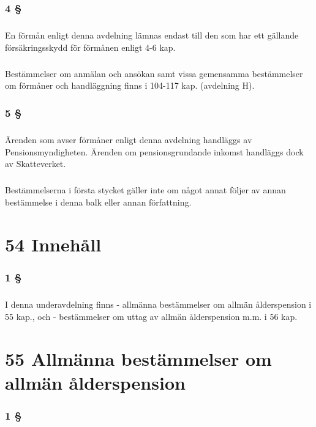 \documentclass[a4paper,notitlepage,openany,10pt]{book}
\begin{document}
\subsection*{4 §}
\paragraph*{}
En förmån enligt denna avdelning lämnas endast till den som har ett gällande försäkringsskydd för förmånen enligt 4-6 kap.
\paragraph*{}
Bestämmelser om anmälan och ansökan samt vissa gemensamma bestämmelser om förmåner och handläggning finns i 104-117 kap. (avdelning H).
\subsection*{5 §}
\paragraph*{}
Ärenden som avser förmåner enligt denna avdelning handläggs av Pensionsmyndigheten. Ärenden om pensionsgrundande inkomst handläggs dock av Skatteverket.
\paragraph*{}
Bestämmelserna i första stycket gäller inte om något annat följer av annan bestämmelse i denna balk eller annan författning.
\chapter*{54 Innehåll}
\subsection*{1 §}
\paragraph*{}
I denna underavdelning finns
\newline - allmänna bestämmelser om allmän ålderspension i 55 kap., och
\newline - bestämmelser om uttag av allmän ålderspension m.m. i 56 kap.
\chapter*{55 Allmänna bestämmelser om allmän ålderspension}
\subsection*{1 §}
\end{document}
